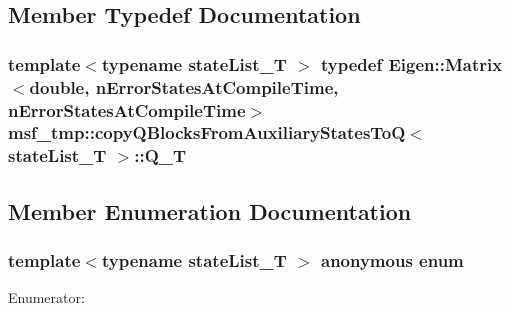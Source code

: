 \subsection{Member Typedef Documentation}
\hypertarget{structmsf__tmp_1_1copyQBlocksFromAuxiliaryStatesToQ_ae129639a59b673f01724af984fde8c2c}{
\subsubsection[{Q\-\_\-\-T}]{\setlength{\rightskip}{0pt plus 5cm}template$<$typename state\-List\-\_\-\-T $>$ typedef Eigen\-::\-Matrix$<$double, {\bf n\-Error\-States\-At\-Compile\-Time}, {\bf n\-Error\-States\-At\-Compile\-Time}$>$ {\bf msf\-\_\-tmp\-::copy\-Q\-Blocks\-From\-Auxiliary\-States\-To\-Q}$<$ state\-List\-\_\-\-T $>$\-::{\bf Q\-\_\-\-T}}}\label{structmsf__tmp_1_1copyQBlocksFromAuxiliaryStatesToQ_ae129639a59b673f01724af984fde8c2c}


\subsection{Member Enumeration Documentation}
\hypertarget{structmsf__tmp_1_1copyQBlocksFromAuxiliaryStatesToQ_a4e1fad7e266ab146be8673fc5f76877b}{\subsubsection[{anonymous enum}]{\setlength{\rightskip}{0pt plus 5cm}template$<$typename state\-List\-\_\-\-T $>$ anonymous enum}}\label{structmsf__tmp_1_1copyQBlocksFromAuxiliaryStatesToQ_a4e1fad7e266ab146be8673fc5f76877b}
\begin{Desc}
\item[Enumerator\-: ]\par
\begin{description}
\item[{\em 
\hypertarget{structmsf__tmp_1_1copyQBlocksFromAuxiliaryStatesToQ_a4e1fad7e266ab146be8673fc5f76877ba3cc565a15fa678e53d797e0f7192f720}{n\-Error\-States\-At\-Compile\-Time}\label{structmsf__tmp_1_1copyQBlocksFromAuxiliaryStatesToQ_a4e1fad7e266ab146be8673fc5f76877ba3cc565a15fa678e53d797e0f7192f720}
}]\end{description}
\end{Desc}



